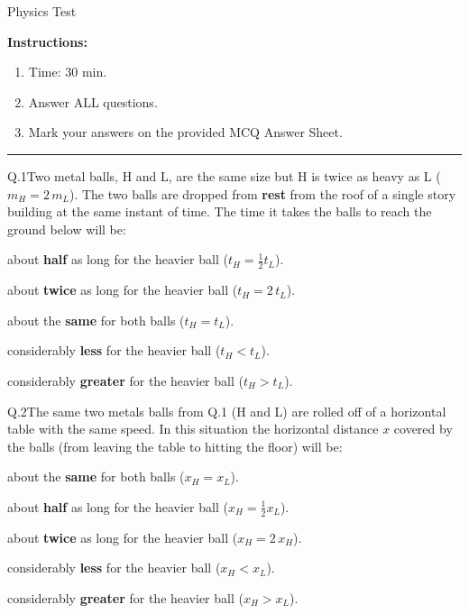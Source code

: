 



    \begin{center}{\Huge Physics Test}\end{center}

    \eline[]
    \textbf{Instructions:}
    \begin{enumerate}
        \item Time: 30 min.
        \item Answer ALL questions.
        \item Mark your answers on the provided MCQ Answer Sheet.
    \end{enumerate}
    \begin{center}\rule{0.7\textwidth}{0.5pt}\end{center}

    \begin{mcq}{Q.1}{Two metal balls, H and L, are the same size but H is twice as heavy as L ($m_H = 2 \, m_L$). The two balls are dropped from \textbf{rest} from the roof of a single story building at the same instant of time. The time it takes the balls to reach the ground below will be:}

        \item about \textbf{half} as long for the heavier ball ($\displaystyle t_H = \frac{1}{2} t_L$).
        \item about \textbf{twice} as long for the heavier ball ($\displaystyle t_H = 2 \, t_L$).
        \item about the \textbf{same} for both balls ($t_H = t_L$).
        \item considerably \textbf{less} for the heavier ball ($t_H < t_L$).
        \item considerably \textbf{greater} for the heavier ball ($t_H > t_L$).
    \end{mcq}


    \begin{mcq}{Q.2}{The same two metals balls from Q.1 (H and L) are rolled off of a horizontal table with the same speed. In this situation the horizontal distance $x$ covered by the balls (from leaving the table to hitting the floor) will be:}

        \item about the \textbf{same} for both balls ($x_H = x_L$).
        \item about \textbf{half} as long for the heavier ball ($\displaystyle x_H = \frac{1}{2} x_L$).
        \item about \textbf{twice} as long for the heavier ball ($\displaystyle x_H = 2 \, x_H$).
        \item considerably \textbf{less} for the heavier ball ($x_H < x_L$).
        \item considerably \textbf{greater} for the heavier ball ($x_H > x_L$).
    \end{mcq}


